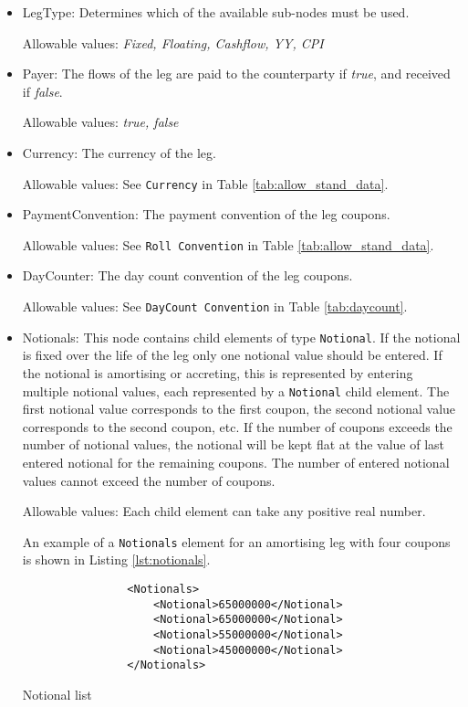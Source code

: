 \begin{itemize}
\item LegType:  Determines which of the available sub-nodes must be
  used. 

Allowable values:  \emph{Fixed, Floating, Cashflow, YY, CPI}

\item Payer:  The flows of the leg are paid to the counterparty if
  \emph{true}, and received if \emph{false}.  

Allowable values:  \emph{true, false} 

\item Currency: The currency of the leg. 

Allowable values:  See \lstinline!Currency! in Table \ref{tab:allow_stand_data}.

\item PaymentConvention: The payment convention of the leg coupons. 

Allowable values: See \lstinline!Roll Convention! in Table \ref{tab:allow_stand_data}.

\item DayCounter: The day count convention of the leg coupons. 

Allowable values: See \lstinline!DayCount Convention! in Table \ref{tab:daycount}.

\item Notionals: This node contains child elements of type
  \lstinline!Notional!. If the notional is fixed over the life of the
  leg only one notional value should be entered. If the notional is
  amortising or accreting, this is represented by entering multiple
  notional values, each represented by a \lstinline!Notional! child
  element. The first notional value corresponds to the first coupon,
  the second notional value corresponds to the second coupon, etc. If
  the number of coupons exceeds the number of notional values, the
  notional will be kept flat at the value of last entered notional for
  the remaining coupons.  The number of entered notional values cannot
  exceed the number of coupons.

Allowable values: Each child element can take any positive real number.

\vspace{1em}

An example of a \lstinline!Notionals! element for an amortising leg with four coupons is shown in Listing \ref{lst:notionals}.
\begin{listing}[H]
\begin{verbatim}
                <Notionals>
                    <Notional>65000000</Notional>
                    <Notional>65000000</Notional>
                    <Notional>55000000</Notional>
                    <Notional>45000000</Notional>
                </Notionals>
\end{verbatim}
\caption{Notional list}
\label{lst:notionals}
\end{listing}


\end{itemize}

